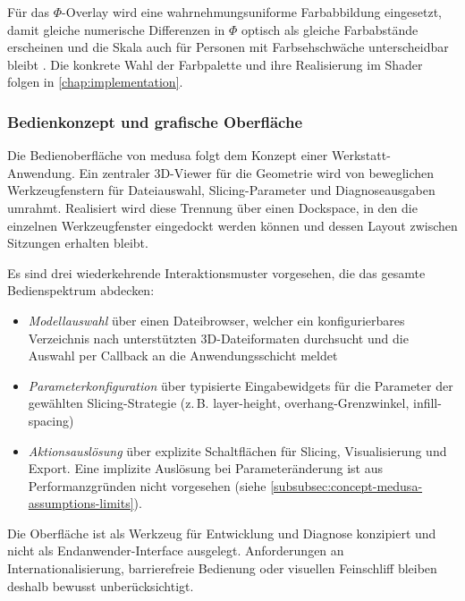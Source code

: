                 Für das $\Phi$-Overlay wird eine wahrnehmungsuniforme Farbabbildung eingesetzt, damit gleiche numerische Differenzen in $\Phi$ optisch als gleiche Farbabstände erscheinen und die Skala auch für Personen mit Farbsehschwäche unterscheidbar bleibt \autocite[vgl.][S.~5--9]{nunezOptimizingColormapsConsideration2018}.
                Die konkrete Wahl der Farbpalette und ihre Realisierung im Shader folgen in \cref{chap:implementation}.

            \subsubsection{Bedienkonzept und grafische Oberfläche}\label{subsubsec:concept-medusa-ui} 
                Die Bedienoberfläche von \ac{medusa} folgt dem Konzept einer Werkstatt-Anwendung.
                Ein zentraler 3D-Viewer für die Geometrie wird von beweglichen Werkzeugfenstern für Dateiauswahl, Slicing-Parameter und Diagnoseausgaben umrahmt.
                Realisiert wird diese Trennung über einen Dockspace, in den die einzelnen Werkzeugfenster eingedockt werden können und dessen Layout zwischen Sitzungen erhalten bleibt.

                Es sind drei wiederkehrende Interaktionsmuster vorgesehen, die das gesamte Bedienspektrum abdecken:
                \begin{itemize}
                    \item \emph{Modellauswahl} über einen Dateibrowser, welcher ein konfigurierbares Verzeichnis nach unterstützten 3D-Dateiformaten durchsucht und die Auswahl per Callback an die Anwendungsschicht meldet
                    \item \emph{Parameterkonfiguration} über typisierte Eingabewidgets für die Parameter der gewählten Slicing-Strategie (z.\,B. \gls{layer-height}, \gls{overhang}-Grenzwinkel, \gls{infill-spacing})
                    \item \emph{Aktionsauslösung} über explizite Schaltflächen für Slicing, Visualisierung und Export.
                        Eine implizite Auslösung bei Parameteränderung ist aus Performanzgründen nicht vorgesehen (siehe \cref{subsubsec:concept-medusa-assumptions-limits}).
                \end{itemize}

                Die Oberfläche ist als Werkzeug für Entwicklung und Diagnose konzipiert und nicht als Endanwender-Interface ausgelegt.
                Anforderungen an Internationalisierung, barrierefreie Bedienung oder visuellen Feinschliff bleiben deshalb bewusst unberücksichtigt.


